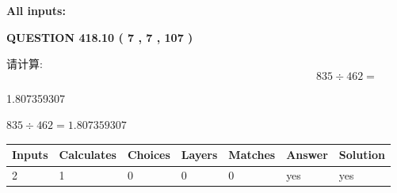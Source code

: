 \documentclass{ctexart}
\begin{document}
   
   
   
\noindent{}
   
   
   
   
\noindent\vspace{0.1in}\hspace{-0.08in} {\textbf{\Large{All inputs: }}}
   
   
  
\vspace{0.2in}
  
{\textbf{\Large{QUESTION
418.10 
 ( 7 , 7 , 107 )
}}}
  
  
 
请计算:
\begin{equation}
835  \div    %
462 = \nonumber
\end{equation}
 
 
 
\noindent{}
 
 

1.807359307
 
 
\noindent{}
 
 

 
 
 
\noindent{}
 
 

$ %
835 \div  %
462=   %
1.807359307$
 
 
\noindent{}
 
 

 
   
   
   
   
\noindent\begin{tabular}{|l|l|l|l|l|l|l|}
 \hline
Inputs & Calculates & Choices & Layers & Matches & Answer & Solution \\ \hline
 2  & 
 1  & 
 0
  & 
 0  & 
 0  & 
  yes & 
  yes 
  \\ \hline
 \end{tabular}
   
   
   
   
\noindent{}
   
\end{document}
